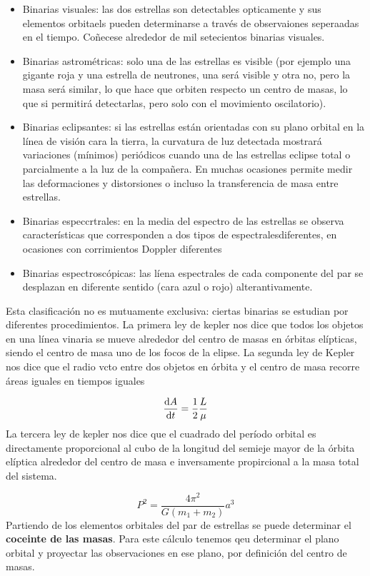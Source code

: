 \begin{itemize}
    \item Binarias visuales: las dos estrellas son detectables opticamente y sus elementos orbitaels pueden determinarse a través de observaiones seperaadas en el tiempo. Coñecese alrededor de mil setecientos binarias visuales.
    \item Binarias astrométricas: solo una de las estrellas es visible (por ejemplo una gigante roja y una estrella de neutrones, una será visible y otra no, pero la masa será similar, lo que hace que orbiten respecto un centro de masas, lo que si permitirá detectarlas, pero solo con el movimiento oscilatorio).
    \item Binarias eclipsantes: si las estrellas están orientadas con su plano orbital en la línea de visión cara la tierra, la curvatura de luz detectada mostrará variaciones (mínimos) periódicos cuando una de las estrellas eclipse total o parcialmente a la luz de la compañera. En muchas ocasiones permite medir las deformaciones y distorsiones o incluso la transferencia de masa entre estrellas. 
    \item Binarias especcrtrales: en la media del espectro de las estrellas se observa características que corresponden a dos tipos de espectralesdiferentes, en ocasiones con corrimientos Doppler diferentes
    \item Binarias espectroscópicas: las líena espectrales de cada componente del par se desplazan en diferente sentido (cara azul o rojo) alterantivamente. 
\end{itemize}
Esta clasificación no es mutuamente exclusiva: ciertas binarias se estudian por diferentes procedimientos. La primera ley de kepler nos dice que todos los objetos en una línea vinaria se mueve alrededor del centro de masas en órbitas elípticas, siendo el centro de masa uno de los focos de la elipse. La segunda ley de Kepler nos dice que el radio vcto entre dos objetos en órbita y el centro de masa recorre áreas iguales en tiempos iguales 

\begin{equation*}
    \frac{\mathrm{d} A}{\mathrm{d} t} = \frac{1}{2} \frac{L}{\mu}
\end{equation*}
La tercera ley de kepler nos dice que el cuadrado del período orbital es directamente proporcional al cubo de la longitud del semieje mayor de la órbita elíptica alrededor del centro de masa e inversamente propircional a la masa total del sistema. 

\begin{equation*}
    P^2 = \frac{4\pi^2}{G(m_1+m_2)} a^3
\end{equation*}
Partiendo de los elementos orbitales del par de estrellas se puede determinar el \textbf{coceinte de las masas}. Para este cálculo tenemos qeu determinar el plano orbital y proyectar las observaciones en ese plano, por definición del centro de masas. 

